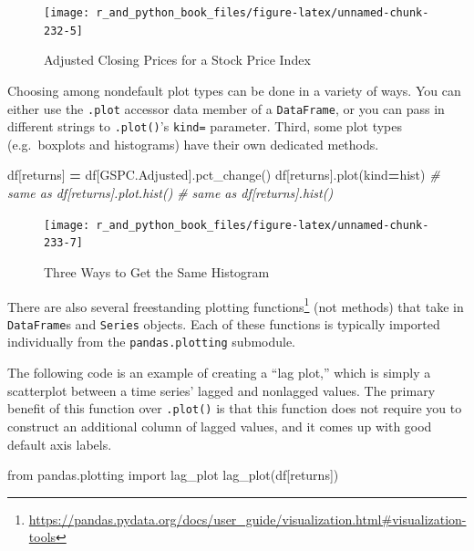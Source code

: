 \documentclass[
  12pt,
  krantz2]{krantz}
\makeatletter
\newenvironment{Shaded}{\begin{snugshade}}{\end{snugshade}}
\newcommand{\CommentTok}[1]{\textcolor[rgb]{0.37,0.37,0.37}{\textit{#1}}}
\newcommand{\ImportTok}[1]{#1}
\newcommand{\NormalTok}[1]{#1}
\newcommand{\OperatorTok}[1]{\textcolor[rgb]{0.43,0.43,0.43}{\textbf{#1}}}
\newcommand{\StringTok}[1]{\textcolor[rgb]{0.5,0.5,0.5}{#1}}
\renewcommand{\href}[2]{#2\footnote{\url{#1}}}
\newenvironment{kframe}{%
\medskip{}
\setlength{\fboxsep}{.8em}
 \def\at@end@of@kframe{}%
 \ifinner\ifhmode%
  \def\at@end@of@kframe{\end{minipage}}%
  \begin{minipage}{\columnwidth}%
 \fi\fi%
 \def\FrameCommand##1{\hskip\@totalleftmargin \hskip-\fboxsep
 \colorbox{shadecolor}{##1}\hskip-\fboxsep
     \hskip-\linewidth \hskip-\@totalleftmargin \hskip\columnwidth}%
 \MakeFramed {\advance\hsize-\width
   \@totalleftmargin\z@ \linewidth\hsize
   \@setminipage}}%
 {\par\unskip\endMakeFramed%
 \at@end@of@kframe}
\renewenvironment{Shaded}{\begin{kframe}}{\end{kframe}}
\makeatother
\begin{document}
\begin{figure}
\texttt{[image: r\_and\_python\_book\_files/figure-latex/unnamed-chunk-232-5]} \caption{Adjusted Closing Prices for a Stock Price Index}\label{fig:unnamed-chunk-232}
\end{figure}

Choosing among nondefault plot types can be done in a variety of ways. You can either use the \texttt{.plot} accessor data member of a \texttt{DataFrame}, or you can pass in different strings to \texttt{.plot()}'s \texttt{kind=} parameter. Third, some plot types (e.g.~boxplots and histograms) have their own dedicated methods.

\begin{Shaded}
\begin{Highlighting}[]
\NormalTok{df[}\StringTok{\textquotesingle{}returns\textquotesingle{}}\NormalTok{] }\OperatorTok{=}\NormalTok{ df[}\StringTok{\textquotesingle{}GSPC.Adjusted\textquotesingle{}}\NormalTok{].pct\_change()}
\NormalTok{df[}\StringTok{\textquotesingle{}returns\textquotesingle{}}\NormalTok{].plot(kind}\OperatorTok{=}\StringTok{\textquotesingle{}hist\textquotesingle{}}\NormalTok{)}
\CommentTok{\# same as df[\textquotesingle{}returns\textquotesingle{}].plot.hist()}
\CommentTok{\# same as df[\textquotesingle{}returns\textquotesingle{}].hist()}
\end{Highlighting}
\end{Shaded}

\begin{figure}
\texttt{[image: r\_and\_python\_book\_files/figure-latex/unnamed-chunk-233-7]} \caption{Three Ways to Get the Same Histogram}\label{fig:unnamed-chunk-233}
\end{figure}

There are also \href{https://pandas.pydata.org/docs/user_guide/visualization.html\#visualization-tools}{several freestanding plotting functions} (not methods) that take in \texttt{DataFrame}s and \texttt{Series} objects. Each of these functions is typically imported individually from the \texttt{pandas.plotting} submodule.

The following code is an example of creating a ``lag plot,'' which is simply a scatterplot between a time series' lagged and nonlagged values. The primary benefit of this function over \texttt{.plot()} is that this function does not require you to construct an additional column of lagged values, and it comes up with good default axis labels.

\begin{Shaded}
\begin{Highlighting}[]
\ImportTok{from}\NormalTok{ pandas.plotting }\ImportTok{import}\NormalTok{ lag\_plot}
\NormalTok{lag\_plot(df[}\StringTok{\textquotesingle{}returns\textquotesingle{}}\NormalTok{])}
\end{Highlighting}
\end{Shaded}
\end{document}
